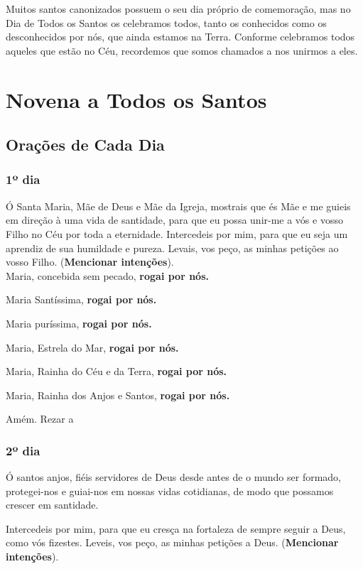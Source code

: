 \documentclass[a4paper,14pt]{extarticle} \usepackage[utf8]{inputenc}
\begin{document}
Muitos santos canonizados possuem o seu dia próprio de comemoração, mas no Dia de Todos os Santos os celebramos todos, tanto os conhecidos como os desconhecidos por nós, que ainda estamos na Terra. Conforme celebramos todos aqueles que estão no Céu, recordemos que somos chamados a nos unirmos a eles.

\newpage

\section{Novena a Todos os Santos}

\subsection{Orações de Cada Dia}
\subsubsection{1º dia}

Ó Santa Maria, Mãe de Deus e Mãe da Igreja, mostrais que és Mãe e me guieis em direção à uma vida de santidade, para que eu possa unir-me a vós e vosso Filho no Céu por toda a eternidade. 
Intercedeis por mim, para que eu seja um aprendiz de sua humildade e pureza. Levais, vos peço, as minhas petições ao vosso Filho. (\textbf{Mencionar intenções}).\\

Maria, concebida sem pecado, \textbf{rogai por nós.}

Maria Santíssima, \textbf{rogai por nós.}

Maria puríssima, \textbf{rogai por nós.}

Maria, Estrela do Mar, \textbf{rogai por nós.}

Maria, Rainha do Céu e da Terra, \textbf{rogai por nós.}

Maria, Rainha dos Anjos e Santos, \textbf{rogai por nós.}

Amém. Rezar a 

\subsubsection{2º dia}

Ó santos anjos, fiéis servidores de Deus desde antes de o mundo ser formado, protegei-nos e guiai-nos em nossas vidas cotidianas, de modo que possamos crescer em santidade.

Intercedeis por mim, para que eu cresça na fortaleza de sempre seguir a Deus, como vós fizestes. Leveis, vos peço, as minhas petições a Deus. (\textbf{Mencionar intenções}).\\
\end{document}
